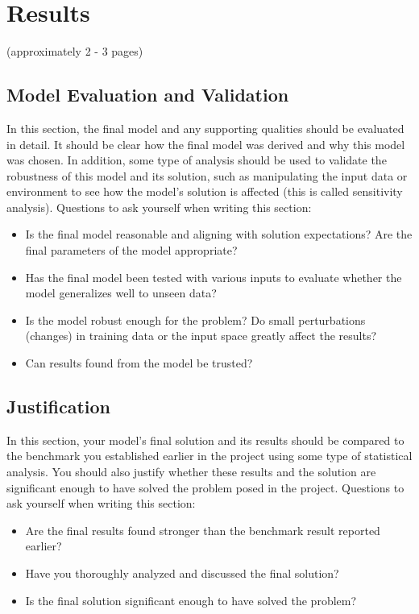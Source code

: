 \documentclass[twoside,openright,titlepage,numbers=noenddot,headinclude,%
               footinclude=true,cleardoublepage=empty,abstractoff,BCOR=5mm,%
               paper=a4,fontsize=11pt,ngerman,american]{scrreprt}
\numberwithin{theorem}{chapter}
\numberwithin{definition}{chapter}
\numberwithin{algorithm}{chapter}
\numberwithin{figure}{chapter}
\numberwithin{table}{chapter}
\numberwithin{equation}{chapter}
\begin{document}
\chapter*{Results}
(approximately 2 - 3 pages)


\section*{Model Evaluation and Validation}
In this section, the final model and any supporting qualities should be evaluated in detail. It should be clear how the final model was derived and why this model was chosen. In addition, some type of analysis should be used to validate the robustness of this model and its solution, such as manipulating the input data or environment to see how the model’s solution is affected (this is called sensitivity analysis). Questions to ask yourself when writing this section:
\begin{itemize}%
\item Is the final model reasonable and aligning with solution expectations? Are the final parameters of the model appropriate?
\item Has the final model been tested with various inputs to evaluate whether the model generalizes well to unseen data?
\item Is the model robust enough for the problem? Do small perturbations (changes) in training data or the input space greatly affect the results?
\item Can results found from the model be trusted?
\end{itemize}

\section*{Justification}
In this section, your model’s final solution and its results should be compared to the benchmark you established earlier in the project using some type of statistical analysis. You should also justify whether these results and the solution are significant enough to have solved the problem posed in the project. Questions to ask yourself when writing this section:
\begin{itemize}%
\item Are the final results found stronger than the benchmark result reported earlier?
\item Have you thoroughly analyzed and discussed the final solution?
\item Is the final solution significant enough to have solved the problem?
\end{itemize}
\end{document}
